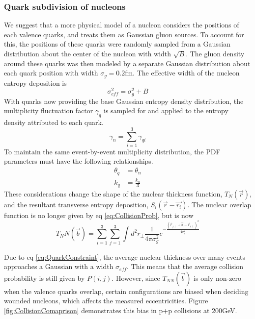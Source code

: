 \documentclass[twocolumn,showpacs,amsfonts,aps,prc,nofootinbib,floatfix]{revtex4}
\begin{document}
\subsubsection{Quark subdivision of nucleons}
\label{sec2b1}
We suggest that a more physical model of a nucleon considers the positions of each valence quarks, and treats them as Gaussian gluon sources. To account for this, the positions of these quarks were randomly sampled from a Gaussian distribution about the center of the nucleon with width $\sqrt{B}$. The gluon density around these quarks was then modeled by a separate Gaussian distribution about each quark position with width $\sigma_g=0.2$fm. The effective width of the nucleon entropy deposition is 
\begin{equation} 
	\label{eq:QuarkConstraint}
	\sigma_{eff}^2 = \sigma_g ^2+B
\end{equation}
With quarks now providing the base Gaussian entropy density distribution, the multiplicity fluctuation factor $\gamma_q$ is sampled for and applied to the entropy density attributed to each quark.
\begin{equation} 
	\gamma_n = \sum_{i=1}^{3} \gamma_{qi}
\end{equation}
To maintain the same event-by-event multiplicity distribution, the PDF parameters must have the following relationships.
\begin{align}
	\theta_q &= \theta_n\\
	k_q &=\frac{k_n}{3}
\end{align}
These considerations change the shape of the nuclear thickness function, $T_N(\vec{r})$, and the resultant transverse entropy deposition, $S_i(\vec{r}-\vec{r_i})$. The nuclear overlap function is no longer given by eq \ref{eq:CollisionProb}, but is now
\begin{equation}
	T_NN(\vec{b}) = \sum_{i=1}^{3}\sum_{j=1}^{3}\int{d^2r_\perp \frac{1}{4 \pi \sigma_g^2} e^{-\frac{(\vec{r}_{j\perp}+\vec{b}-\vec{r}_{i\perp})^2}{4 \sigma_g^2}}}
\end{equation}

Due to eq \ref{eq:QuarkConstraint}, the average nuclear thickness over many events approaches a Gaussian with a width $\sigma_{eff}$. This means that the average collision probability is still given by $P(i,j)$. However, since $T_{NN}(\vec{b})$ is only non-zero when the valence quarks overlap, certain configurations are biased when deciding wounded nucleons, which affects the measured eccentricities. Figure \ref{fig:CollisionComaprison} demonstrates this bias in p+p collisions at 200GeV.
\end{document}
